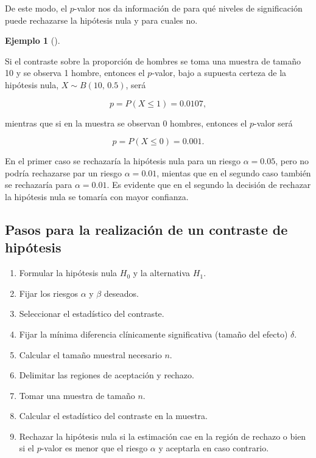 \documentclass[
  a4paper,
]{scrreport}
\providecommand{\tightlist}{%
  \setlength{\itemsep}{0pt}\setlength{\parskip}{0pt}}\usepackage{longtable,booktabs,array}
\theoremstyle{definition}
\theoremstyle{definition}
\newtheorem{example}{Ejemplo}[chapter]
\theoremstyle{plain}
\theoremstyle{remark}
\begin{document}
De este modo, el \(p\)-valor nos da información de para qué niveles de
significación puede rechazarse la hipótesis nula y para cuales no.

\begin{example}[]\protect\hypertarget{exm-p-valor}{}\label{exm-p-valor}

Si el contraste sobre la proporción de hombres se toma una muestra de
tamaño 10 y se observa 1 hombre, entonces el \(p\)-valor, bajo a
supuesta certeza de la hipótesis nula, \(X\sim B(10,\, 0.5)\), será

\[p = P(X\leq 1)= 0.0107,\]

mientras que si en la muestra se observan 0 hombres, entonces el
\(p\)-valor será

\[p = P(X\leq 0)= 0.001.\]

En el primer caso se rechazaría la hipótesis nula para un riesgo
\(\alpha=0.05\), pero no podría rechazarse par un riesgo
\(\alpha=0.01\), mientas que en el segundo caso también se rechazaría
para \(\alpha=0.01\). Es evidente que en el segundo la decisión de
rechazar la hipótesis nula se tomaría con mayor confianza.

\end{example}

\hypertarget{pasos-para-la-realizaciuxf3n-de-un-contraste-de-hipuxf3tesis}{%
\subsection{Pasos para la realización de un contraste de
hipótesis}\label{pasos-para-la-realizaciuxf3n-de-un-contraste-de-hipuxf3tesis}}

\begin{enumerate}
\def\labelenumi{\arabic{enumi}.}
\tightlist
\item
  Formular la hipótesis nula \(H_0\) y la alternativa \(H_1\).
\item
  Fijar los riesgos \(\alpha\) y \(\beta\) deseados.
\item
  Seleccionar el estadístico del contraste.
\item
  Fijar la mínima diferencia clínicamente significativa (tamaño del
  efecto) \(\delta\).
\item
  Calcular el tamaño muestral necesario \(n\).
\item
  Delimitar las regiones de aceptación y rechazo.
\item
  Tomar una muestra de tamaño \(n\).
\item
  Calcular el estadístico del contraste en la muestra.
\item
  Rechazar la hipótesis nula si la estimación cae en la región de
  rechazo o bien si el \(p\)-valor es menor que el riesgo \(\alpha\) y
  aceptarla en caso contrario.
\end{enumerate}
\end{document}
